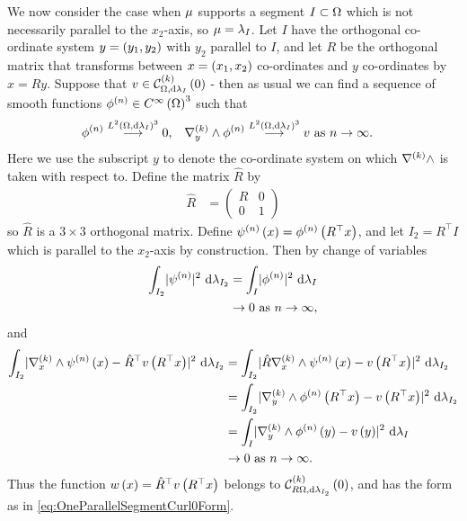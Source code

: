 We now consider the case when $\mu$ supports a segment $I\subset\Omega$ which is not necessarily parallel to the $x_2$-axis, so $\mu=\lambda_I$.
Let $I$ have the orthogonal co-ordinate system $y=\left( y_1,y_2 \right)$ with $y_2$ parallel to $I$, and let $R$ be the orthogonal matrix that transforms between $x=\left( x_1,x_2 \right)$ co-ordinates and $y$ co-ordinates by $x=Ry$.
Suppose that $v\in\mathcal{C}_{ \Omega, \mathrm{d}\lambda_I}^{(k)}\left( 0 \right)$ - then as usual we can find a sequence of smooth functions $\phi^{(n)}\in C^{\infty}\left( \Omega \right)^3$ such that
\begin{align*}
	\phi^{(n)} \overset{L^{2}\left( \Omega,\mathrm{d}\lambda_I \right)^3}{\longrightarrow} 0, &\quad \nabla_{y}^{(k)}\wedge\phi^{(n)} \overset{L^{2}\left( \Omega,\mathrm{d}\lambda_I \right)^3}{\longrightarrow} v \ \text{as} \ n \rightarrow\infty.
\end{align*}
Here we use the subscript $y$ to denote the co-ordinate system on which $\nabla_{}^{(k)}\wedge$ is taken with respect to.
Define the matrix $\hat{R}$ by
\begin{align*}
	\hat{R} &= 
	\begin{pmatrix}
		R & 0 \\
		0 & 1
	\end{pmatrix}
\end{align*}
so $\hat{R}$ is a $3\times3$ orthogonal matrix.
Define $\psi^{(n)}\left( x \right) = \phi^{(n)}\left( R^\top x \right)$, and let $I_2 = R^\top I$ which is parallel to the $x_2$-axis by construction.
Then by change of variables
\begin{align*}
	\int_{I_2}\lvert \psi^{(n)} \rvert^2 \ \mathrm{d}\lambda_{I_2}
	&= \int_{I}\lvert \phi^{(n)} \rvert^2 \ \mathrm{d}\lambda_I \\
	&\rightarrow0 \ \text{as} \ n \rightarrow\infty,
\end{align*}
and
\begin{align*}
	\int_{I_2}\lvert \nabla_{x}^{(k)}\wedge\psi^{(n)}\left( x \right)-\hat{R}^\top v\left( R^\top x \right) \rvert^2 \ \mathrm{d}\lambda_{I_2}
	&= \int_{I_2}\lvert \hat{R}\nabla_{x}^{(k)}\wedge\psi^{(n)}\left( x \right)- v\left( R^\top x \right) \rvert^2 \ \mathrm{d}\lambda_{I_2} \\
	&= \int_{I_2}\lvert \nabla_{y}^{(k)}\wedge\phi^{(n)}\left( R^\top x \right)- v\left( R^\top x \right) \rvert^2 \ \mathrm{d}\lambda_{I_2} \\
	&= \int_{I}\lvert \nabla_{y}^{(k)}\wedge\phi^{(n)}\left( y \right)- v\left( y \right) \rvert^2 \ \mathrm{d}\lambda_I \\
	&\rightarrow0 \ \text{as} \ n \rightarrow\infty.
\end{align*}
Thus the function $w\left( x \right) = \hat{R}^\top v\left( R^\top x \right)$ belongs to $\mathcal{C}_{ R\Omega, \mathrm{d}\lambda_{I_2}}^{(k)}\left( 0 \right)$, and has the form as in \eqref{eq:OneParallelSegmentCurl0Form}.

